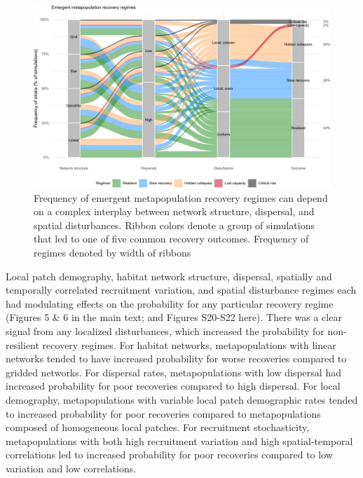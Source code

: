 \documentclass[
]{article}
\begin{document}
\begin{figure}[H]

{\centering \includegraphics{Managing_for_ecological_surprises_in_metapopulations_files/figure-latex/cluster results-1} 

}

\caption{Frequency of emergent metapopulation recovery regimes can depend on a complex interplay between network structure, dispersal, and spatial disturbances. Ribbon colors denote a group of simulations that led to one of five common recovery outcomes. Frequency of regimes denoted by width of ribbons}\label{fig:cluster results}
\end{figure}

Local patch demography, habitat network structure, dispersal, spatially
and temporally correlated recruitment variation, and spatial disturbance
regimes each had modulating effects on the probability for any
particular recovery regime (Figures 5 \& 6 in the main text; and Figures
S20-S22 here). There was a clear signal from any localized disturbances,
which increased the probability for non-resilient recovery regimes. For
habitat networks, metapopulations with linear networks tended to have
increased probability for worse recoveries compared to gridded networks.
For dispersal rates, metapopulations with low dispersal had increased
probability for poor recoveries compared to high dispersal. For local
demography, metapopulations with variable local patch demographic rates
tended to increased probability for poor recoveries compared to
metapopulations composed of homogeneous local patches. For recruitment
stochasticity, metapopulations with both high recruitment variation and
high spatial-temporal correlations led to increased probability for poor
recoveries compared to low variation and low correlations.
\end{document}
